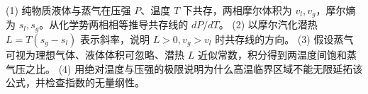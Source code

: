 (1) 纯物质液体与蒸气在压强 \(P\)、温度 \(T\) 下共存，两相摩尔体积为 \(v_l,v_g\)，摩尔熵为 \(s_l,s_g\)。从化学势两相相等推导共存线的 \(dP/dT\)。
(2) 以摩尔汽化潜热 \(L=T(s_g-s_l)\) 表示斜率，说明 \(L>0,v_g>v_l\) 时共存线的方向。
(3) 假设蒸气可视为理想气体、液体体积可忽略、潜热 \(L\) 近似常数，积分得到两温度间饱和蒸气压之比。
(4) 用绝对温度与压强的极限说明为什么高温临界区域不能无限延拓该公式，并检查指数的无量纲性。
